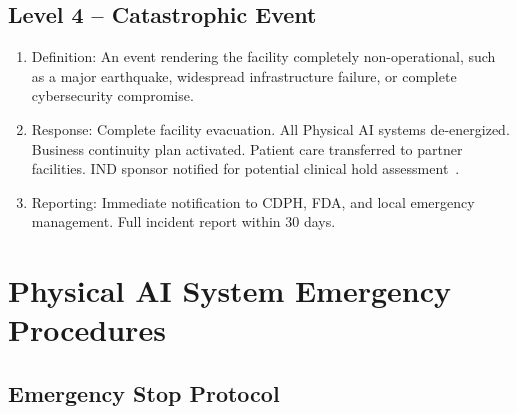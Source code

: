 \subsection{Level 4 -- Catastrophic Event}

\begin{enumerate}[label=(\alph*)]
\item Definition: An event rendering the facility completely non-operational,
  such as a major earthquake, widespread infrastructure failure, or complete
  cybersecurity compromise.

\item Response: Complete facility evacuation. All Physical AI systems
  de-energized. Business continuity plan activated. Patient care transferred
  to partner facilities. IND sponsor notified for potential clinical
  hold assessment~\cite{cfr312adapt}.

\item Reporting: Immediate notification to CDPH, FDA, and local emergency
  management. Full incident report within 30 days.
\end{enumerate}

\section{Physical AI System Emergency Procedures}

\subsection{Emergency Stop Protocol}

